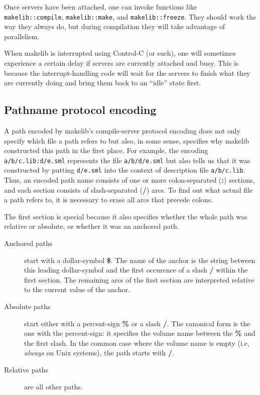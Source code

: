 Once servers have been attached, one can invoke functions like
{\tt makelib::compile}, {\tt makelib::make}, and {\tt makelib::freeze}.
They should work the way they always do, but during compilation they
will take advantage of parallelism.

When makelib is interrupted using Control-C (or such), one will sometimes
experience a certain delay if servers are currently attached and busy.
This is because the interrupt-handling code will wait for the servers
to finish what they are currently doing and bring them back to an
``idle'' state first.

\subsection{Pathname protocol encoding}
\label{sec:pathencode}

A path encoded by makelib's compile-server protocol encoding does not only
specify which file a path refers to but also, in some sense, specifies
why makelib constructed this path in the first place.  For example, the
encoding {\tt a/b/c.lib:d/e.sml} represents the file {\tt a/b/d/e.sml}
but also tells us that it was constructed by putting {\tt d/e.sml}
into the context of description file {\tt a/b/c.lib}.  Thus, an encoded
path name consists of one or more colon-separated ({\bf :}) sections,
and each section consists of slash-separated ({\bf /}) arcs.  To find
out what actual file a path refers to, it is necessary to erase all
arcs that precede colons.

The first section is special because it also specifies whether the
whole path was relative or absolute, or whether it was an anchored
path.

\begin{description}
\item[Anchored paths] start with a dollar-symbol {\bf \$}.  The name
of the anchor is the string between this leading dollar-symbol and the
first occurence of a slash {\bf /} within the first section.  The
remaining arcs of the first section are interpreted relative to the
current value of the anchor.
\item[Absolute paths] start either with a percent-sign {\bf \%} or a
slash {\bf /}.  The canonical form is the one with the percent-sign:
it specifies the volume name between the {\bf \%} and the first slash.
In the common case where the volume name is empty (i.e, {\em always} on
Unix systems), the path starts with {\bf /}.
\item[Relative paths] are all other paths.
\end{description}


